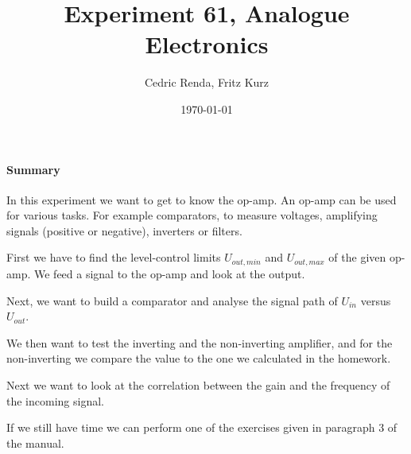 \documentclass[12pt,a4paper]{article}
\title{Experiment 61, Analogue Electronics}
\author{Cedric Renda, Fritz Kurz}
\date{\today }
\begin{document}
\maketitle
\paragraph{Summary}
In this experiment we want to get to know the op-amp.
An op-amp can be used for various tasks.
For example comparators, to measure voltages, amplifying signals (positive or negative), inverters or filters.

First we have to find the level-control limits $U_{out, min}$ and $U_{out, max}$ of the given op-amp.
We feed a signal to the op-amp and look at the output.

Next, we want to build a comparator and analyse the signal path of $U_{in}$ versus $U_{out}$.

We then want to test the inverting and the non-inverting amplifier, and for the non-inverting we compare the value to the one we calculated in the homework.

Next we want to look at the correlation between the gain and the frequency of the incoming signal. 

If we still have time we can perform one of the exercises given in paragraph 3 of the manual. 

	
	
\end{document}
